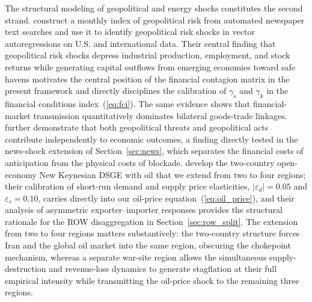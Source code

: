 \documentclass[12pt]{article}
\begin{document}
The structural modeling of geopolitical and energy shocks constitutes the second strand. \citet{caldara2022measuring} construct a monthly index of geopolitical risk from automated newspaper text searches and use it to identify geopolitical risk shocks in vector autoregressions on U.S. and international data. Their central finding that geopolitical risk shocks depress industrial production, employment, and stock returns while generating capital outflows from emerging economies toward safe havens motivates the central position of the financial contagion matrix in the present framework and directly disciplines the calibration of $\gamma_s$ and $\gamma_k$ in the financial conditions index~(\ref{eq:fci}). The same evidence shows that financial-market transmission quantitatively dominates bilateral goods-trade linkages. \citet{caldara2022measuring} further demonstrate that both geopolitical threats and geopolitical acts contribute independently to economic outcomes, a finding directly tested in the news-shock extension of Section~\ref{sec:news}, which separates the financial costs of anticipation from the physical costs of blockade. \citet{bodenstein2011oil} develop the two-country open-economy New Keynesian DSGE with oil that we extend from two to four regions; their calibration of short-run demand and supply price elasticities, $|\varepsilon_d| = 0.05$ and $\varepsilon_s = 0.10$, carries directly into our oil-price equation~(\ref{eq:oil_price}), and their analysis of asymmetric exporter--importer responses provides the structural rationale for the ROW disaggregation in Section~\ref{sec:row_split}. The extension from two to four regions matters substantively: the two-country structure forces Iran and the global oil market into the same region, obscuring the chokepoint mechanism, whereas a separate war-site region allows the simultaneous supply-destruction and revenue-loss dynamics to generate stagflation at their full empirical intensity while transmitting the oil-price shock to the remaining three regions.
\end{document}
